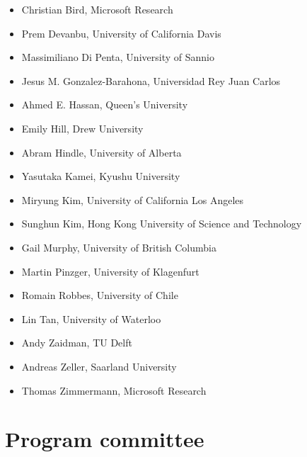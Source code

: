 \documentclass[a4paper]{report}
\begin{document}
\begin{itemize}
\item Christian Bird, Microsoft Research
\item Prem Devanbu, University of California Davis
\item Massimiliano Di Penta, University of Sannio
\item Jesus M. Gonzalez-Barahona, Universidad Rey Juan Carlos
\item Ahmed E. Hassan, Queen's University
\item Emily Hill, Drew University
\item Abram Hindle, University of Alberta
\item Yasutaka Kamei, Kyushu University
\item Miryung Kim, University of California Los Angeles
\item Sunghun Kim, Hong Kong University of Science and Technology
\item Gail Murphy, University of British Columbia
\item Martin Pinzger, University of Klagenfurt
\item Romain Robbes, University of Chile
\item Lin Tan, University of Waterloo
\item Andy Zaidman, TU Delft
\item Andreas Zeller, Saarland University
\item Thomas Zimmermann, Microsoft Research
\end{itemize}

\section{Program committee}
\end{document}
